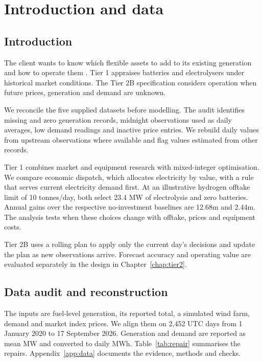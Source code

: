 \chapter{Introduction and data}\label{chap:common}
\section{Introduction}\label{sec:intro}
The client wants to know which flexible assets to add to its existing
generation and how to operate them \cite{brief}. Tier 1 appraises batteries
and electrolysers under historical market conditions. The Tier 2B
specification considers operation when future prices, generation and demand
are unknown.

We reconcile the five supplied datasets before modelling. The audit
identifies missing and zero generation records, midnight observations used
as daily averages, low demand readings and inactive price entries.
We rebuild daily values from upstream observations where available and
flag values estimated from other records.

Tier 1 combines market and equipment research with mixed-integer
optimisation. We compare economic dispatch, which allocates electricity by
value, with a rule that serves current electricity demand first. At an
illustrative hydrogen offtake limit of 10 tonnes/day, both select
23.4 MW of electrolysis and zero batteries. Annual gains over the respective
no-investment baselines are \gbp 12.68m and \gbp 2.44m. The analysis tests
when these choices change with offtake, prices and equipment costs.

Tier 2B uses a rolling plan to apply only the current day's decisions
and update the plan as new observations arrive. Forecast accuracy and
operating value are evaluated separately in the design in
Chapter~\ref{chap:tier2}.

\section{Data audit and reconstruction}\label{sec:data}
The inputs are fuel-level generation, its reported total, a simulated wind
farm, demand and market index prices. We align them on 2,452 UTC days from
1 January 2020 to 17 September 2026. Generation and demand are reported as
mean MW and converted to daily MWh. Table~\ref{tab:repair} summarises the
repairs. Appendix~\ref{app:data} documents the evidence, methods and checks.

